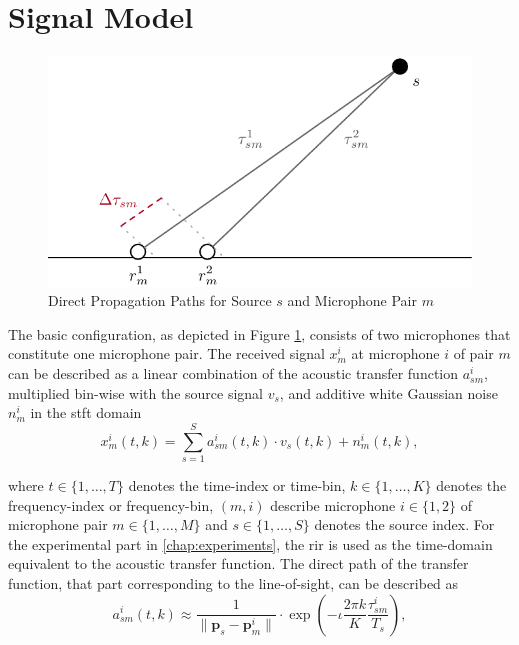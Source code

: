 \section{Signal Model}
\label{sec:signal}

\begin{figure}[!b]
\centering
    \includegraphics[scale=0.7]{data/figures/signal2}
    \caption{Direct Propagation Paths for Source $s$ and Microphone Pair $m$}
    \label{fig:signal}
\end{figure}

The basic configuration, as depicted in Figure \ref{fig:signal}, consists of two microphones that constitute one microphone pair. The received signal $x^i_m$ at microphone $i$ of pair $m$ can be described as a linear combination of the acoustic transfer function $a^i_{sm}$, multiplied bin-wise with the source signal $v_s$, and additive white Gaussian noise $n^i_m$ in the \acrfull{stft} domain
\begin{equation}
	x_m^i(t,k)=\sum_{s=1}^{S}a_{sm}^i(t,k)\cdot v_s(t,k)+n_m^i(t,k),
	\label{eq:x}
\end{equation}

where $t\in\{1,\dots,T\}$ denotes the time-index or time-bin, $k\in\{1,\dots,K\}$ denotes the frequency-index or frequency-bin, $(m,i)$ describe microphone $i\in\{1,2\}$ of microphone pair $m\in\{1,\dots,M\}$ and $s\in\{1,\dots,S\}$ denotes the source index. For the experimental part in \autoref{chap:experiments}, the \gls{rir} is used as the time-domain equivalent to the acoustic transfer function. The direct path of the transfer function, that part corresponding to the line-of-sight, can be described as
\begin{equation}
	a_{sm}^i(t,k)\approx\frac{1}{\|\bm p_s-\bm p_m^i\|}\cdot\exp{\left(-\iota\frac{2\pi k}{K}\frac{\tau^i_{sm}}{T_s}\right)},
	\label{eq:acoustic_transfer_function}
\end{equation}

